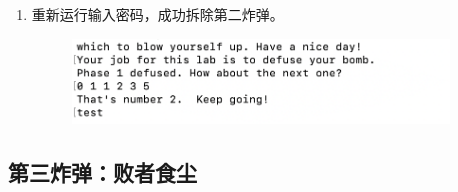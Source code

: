 \begin{enumerate}
            \newpage
            \item 重新运行输入密码，成功拆除第二炸弹。
                \begin{figure}[htbp]
                    \hspace*{1.2cm}
                    \includegraphics*[width = 10cm]{s2_8.png}
                \end{figure}
        \end{enumerate}
    \subsection{第三炸弹：败者食尘}
